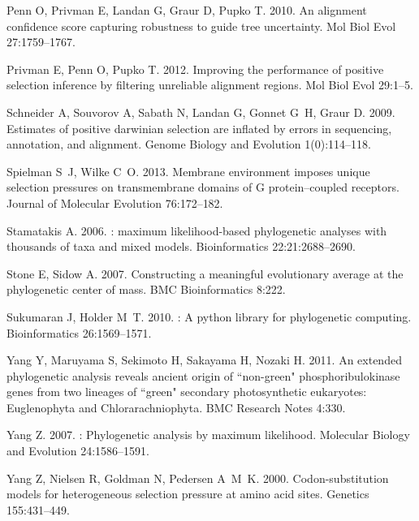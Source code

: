 \documentclass[11pt]{article}
\begin{document}
\begin{thebibliography}{27}
Penn O, Privman E, Landan G, Graur D, Pupko T. 2010.
\newblock An alignment confidence score capturing robustness to guide tree
  uncertainty.
\newblock Mol Biol Evol 27:1759--1767.

Privman E, Penn O, Pupko T. 2012.
\newblock Improving the performance of positive selection inference by
  filtering unreliable alignment regions.
\newblock Mol Biol Evol 29:1--5.

Schneider A, Souvorov A, Sabath N, Landan G, Gonnet G~H, Graur D. 2009.
\newblock Estimates of positive darwinian selection are inflated by errors in
  sequencing, annotation, and alignment.
\newblock Genome Biology and Evolution 1(0):114--118.

Spielman S~J, Wilke C~O. 2013.
\newblock Membrane environment imposes unique selection pressures on
  transmembrane domains of {G protein--coupled receptors}.
\newblock Journal of Molecular Evolution 76:172--182.

Stamatakis A. 2006.
: maximum likelihood-based phylogenetic analyses with
  thousands of taxa and mixed models.
\newblock Bioinformatics 22:21:2688--2690.

Stone E, Sidow A. 2007.
\newblock Constructing a meaningful evolutionary average at the phylogenetic
  center of mass.
\newblock BMC Bioinformatics 8:222.

Sukumaran J, Holder M~T. 2010.
: A python library for phylogenetic computing.
\newblock Bioinformatics 26:1569--1571.

Yang Y, Maruyama S, Sekimoto H, Sakayama H, Nozaki H. 2011.
\newblock An extended phylogenetic analysis reveals ancient origin of
  {``non-green"} phosphoribulokinase genes from two lineages of {``green"}
  secondary photosynthetic eukaryotes: {Euglenophyta and Chlorarachniophyta}.
\newblock BMC Research Notes 4:330.

Yang Z. 2007.
: Phylogenetic analysis by maximum likelihood.
\newblock Molecular Biology and Evolution 24:1586--1591.

Yang Z, Nielsen R, Goldman N, Pedersen A~M~K. 2000.
\newblock Codon-substitution models for heterogeneous selection pressure at
  amino acid sites.
\newblock Genetics 155:431--449.

\end{thebibliography}
\end{document}
